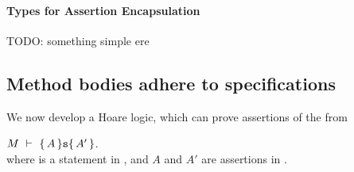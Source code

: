 \paragraph{Types for Assertion Encapsulation}
\label{types}
TODO: something simple ere 
%
%

\subsection{Method bodies adhere to \AssertLang specifications}
\label{s:classical-proof}
 
We now develop a Hoare logic, which can prove assertions of the from \\
\strut \hspace{1cm} $M\ \vdash\ \{\,A\, \} {\texttt{s}} \{\,A'\, \}$.\\
where  is a statement in \Loo, and $A$ and $A'$ are assertions in \AssertLang.

